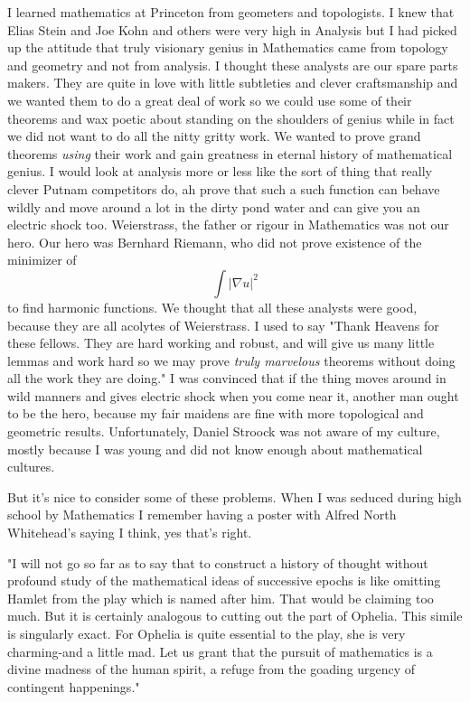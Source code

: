 \documentclass{amsart}
\begin{document}
I learned mathematics at Princeton from geometers and topologists.  I knew that Elias Stein and Joe Kohn and others were very high in Analysis but I had picked up the attitude that truly visionary genius in Mathematics came from topology and geometry and not from analysis.  I thought these analysts are our spare parts makers.  They are quite in love with little subtleties and clever craftsmanship and we wanted them to do a great deal of work so we could use some of their theorems and wax poetic about standing on the shoulders of genius while in fact we did not want to do all the nitty gritty work.  We wanted to prove grand theorems {\em using} their work and gain greatness in eternal history of mathematical genius.  I would look at analysis more or less like the sort of thing that really clever Putnam competitors do, ah prove that such a such function can behave wildly and move around a lot in the dirty pond water and can give you an electric shock too.  Weierstrass, the father or rigour in Mathematics was not our hero.  Our hero was Bernhard Riemann, who did not prove existence of the minimizer of 
\[
\int |\nabla u|^2
\]
to find harmonic functions.  We thought that all these analysts were good, because they are all acolytes of Weierstrass.  I used to say "Thank Heavens for these fellows.  They are hard working and robust, and will give us many little lemmas and work hard so we may prove {\em truly marvelous} theorems without doing all the work they are doing." I was convinced that if the thing moves around in wild manners and gives electric shock when you come near it, another man ought to be the hero, because my fair maidens are fine with more topological and geometric results.  Unfortunately, Daniel Stroock was not aware of my culture, mostly because I was young and did not know enough about mathematical cultures.



But it's nice to consider some of these problems.  When I was seduced during high school by Mathematics I remember having a poster with Alfred North Whitehead's saying I think, yes that's right.

"I will not go so far as to say that to construct a history of thought without profound study of the mathematical ideas of successive epochs is like omitting Hamlet from the play which is named after him. That would be claiming too much. But it is certainly analogous to cutting out the part of Ophelia. This simile is singularly exact. For Ophelia is quite essential to the play, she is very charming-and a little mad. Let us grant that the pursuit of mathematics is a divine madness of the human spirit, a refuge from the goading urgency of contingent happenings."
\end{document}
